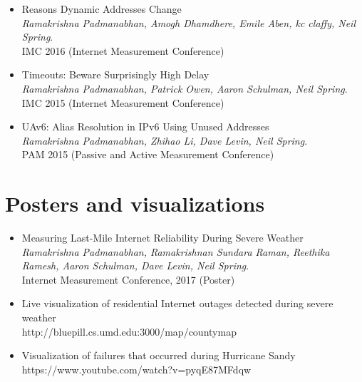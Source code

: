 \begin{itemize}
\item  Reasons Dynamic Addresses Change \\
  \emph{Ramakrishna Padmanabhan, Amogh Dhamdhere, Emile Aben, kc
    claffy, Neil
    Spring}. \\ 
  IMC 2016 (Internet Measurement Conference) \\

\item  Timeouts: Beware Surprisingly High Delay \\
  \emph{Ramakrishna Padmanabhan, Patrick Owen, Aaron Schulman, Neil
    Spring}. \\ 
  IMC 2015 (Internet Measurement Conference)\\

\item  UAv6: Alias Resolution in IPv6 Using Unused Addresses \\
  \emph{Ramakrishna Padmanabhan, Zhihao Li, Dave Levin, Neil
    Spring}. \\
  PAM 2015 (Passive and Active Measurement Conference) \\

\end{itemize}


\section*{Posters and visualizations}
\label{sec: viz}
\begin{itemize}

\item Measuring Last-Mile Internet Reliability During Severe Weather \\
\emph{Ramakrishna Padmanabhan, Ramakrishnan Sundara Raman, Reethika
  Ramesh, Aaron Schulman, Dave Levin, Neil Spring}. \\
Internet Measurement Conference, 2017 (Poster) \\

\item  Live visualization of residential Internet outages detected
  during severe weather  \\
  http://bluepill.cs.umd.edu:3000/map/countymap \\

\item  Visualization of failures that occurred during Hurricane Sandy \\
  https://www.youtube.com/watch?v=pyqE87MFdqw \\

\end{itemize}



